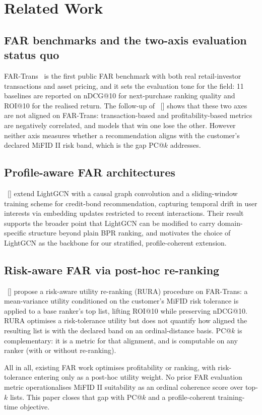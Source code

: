 \section{Related Work}
\label{sec:relatedwork}

\subsection{FAR benchmarks and the two-axis evaluation status quo}
FAR-Trans~\cite{sanzcruzado:fartrans} is the first public FAR benchmark with both real retail-investor transactions and asset pricing, and it sets the evaluation tone for the field: 11 baselines are reported on nDCG@10 for next-purchase ranking quality and ROI@10 for the realised return. The follow-up of \citeauthor{sanzcruzado:investors}~[\citeyear{sanzcruzado:investors}] shows that these two axes are not aligned on FAR-Trans: transaction-based and profitability-based metrics are negatively correlated, and models that win one lose the other. However neither axis measures whether a recommendation aligns with the customer's declared MiFID II risk band, which is the gap PC@$k$ addresses.

\subsection{Profile-aware FAR architectures}
\citeauthor{ghiye:rolling-forward}~[\citeyear{ghiye:rolling-forward}] extend LightGCN with a causal graph convolution and a sliding-window training scheme for credit-bond recommendation, capturing temporal drift in user interests via embedding updates restricted to recent interactions. Their result supports the broader point that LightGCN can be modified to carry domain-specific structure beyond plain BPR ranking, and motivates the choice of LightGCN as the backbone for our stratified, profile-coherent extension.

\subsection{Risk-aware FAR via post-hoc re-ranking}
\citeauthor{sakurai:risk-aware}~[\citeyear{sakurai:risk-aware}] propose a risk-aware utility re-ranking (RURA) procedure on FAR-Trans: a mean-variance utility conditioned on the customer's MiFID risk tolerance is applied to a base ranker's top list, lifting ROI@10 while preserving nDCG@10. RURA optimises a risk-tolerance utility but does not quantify how aligned the resulting list is with the declared band on an ordinal-distance basis. PC@$k$ is complementary: it is a metric for that alignment, and is computable on any ranker (with or without re-ranking).

All in all, existing FAR work optimises profitability or ranking, with risk-tolerance entering only as a post-hoc utility weight. No prior FAR evaluation metric operationalises MiFID II suitability as an ordinal coherence score over top-$k$ lists. This paper closes that gap with PC@$k$ and a profile-coherent training-time objective.
